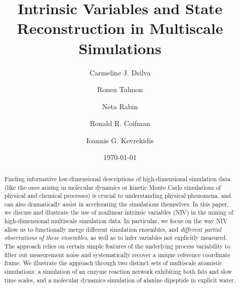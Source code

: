 \documentclass[aip,jcp,preprint]{revtex4-1}
\begin{document}
\title{Intrinsic Variables and State Reconstruction in Multiscale Simulations}

\author{Carmeline J. Dsilva}

\author{Ronen Talmon}

\author{Neta Rabin}

\author{Ronald R. Coifman}

\author{Ioannis G. Kevrekidis}

\date{\today}

\begin{abstract}
Finding informative low-dimensional descriptions of high-dimensional simulation data
(like the ones arising in molecular dynamics or kinetic Monte Carlo simulations of
physical and chemical processes) is crucial to understanding physical phenomena, and can
also dramatically assist in accelerating the simulations themselves.
%
In this paper, we discuss and illustrate the use of nonlinear intrinsic variables (NIV)
in the mining of high-dimensional multiscale simulation data.
%
In particular, we focus on the way NIV allow us to functionally merge different
simulation ensembles, and {\em different partial observations of these ensembles}, as well
as to infer variables not explicitly measured.
%
The approach relies on certain simple features of the underlying process variability to
filter out measurement noise and systematically recover a unique reference coordinate frame.
%
We illustrate the approach through two distinct sets of multiscale atomistic simulations:
a simulation of an enzyme reaction network exhibiting both fats and slow time scales,
 and a molecular dynamics simulation of alanine dipeptide in explicit water.

\end{abstract}
\end{document}
